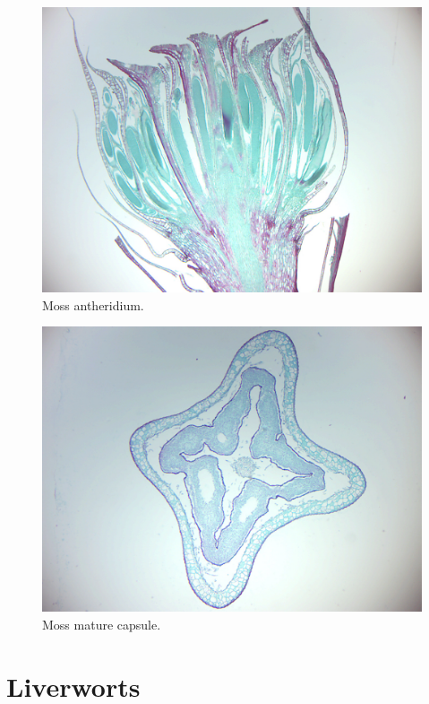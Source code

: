 \begin{figure}

{\centering \includegraphics[width=0.7\linewidth]{./figures/mosses/moss_antheridium}

}

\caption{Moss antheridium.}\label{fig:mossantheridium}
\end{figure}

\begin{figure}

{\centering \includegraphics[width=0.7\linewidth]{./figures/mosses/moss_capsule}

}

\caption{Moss mature capsule.}\label{fig:mosscapsule}
\end{figure}

\section{Liverworts}\label{liverworts}


